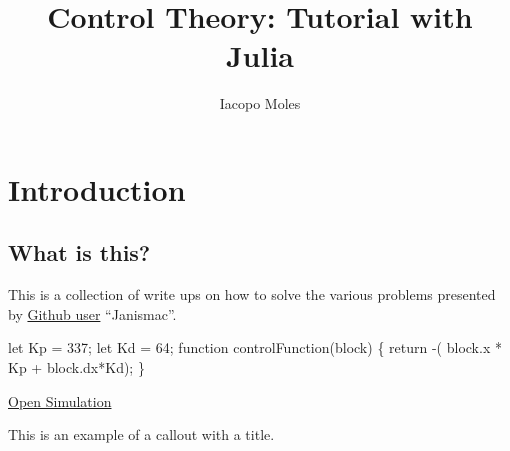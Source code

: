 \documentclass[
  8pt,
  a4paper,
]{book}
\title{Control Theory: Tutorial with Julia}
\author{Iacopo Moles}
\date{}
\newenvironment{Shaded}{\begin{snugshade}}{\end{snugshade}}
\newcommand{\NormalTok}[1]{\textcolor[rgb]{0.00,0.23,0.31}{#1}}
\renewcommand*\contentsname{Table of contents}
\newcommand\contentsname{Table of contents}
\begin{document}
\frontmatter
\maketitle


\renewcommand*\contentsname{Table of contents}
{
\setcounter{tocdepth}{2}
\tableofcontents
}

\mainmatter
{}

\chapter{Introduction}\label{introduction}

\section{What is this?}\label{what-is-this}

This is a collection of write ups on how to solve the various problems
presented by \href{https://janismac.github.io/ControlChallenges/}{Github
user} ``Janismac''.

\begin{Shaded}
\begin{Highlighting}[]
\NormalTok{let Kp = 337;}
\NormalTok{let Kd = 64;}
\NormalTok{function controlFunction(block)}
\NormalTok{\{}
\NormalTok{  return {-}( block.x * Kp + block.dx*Kd);}
\NormalTok{\}}
\end{Highlighting}
\end{Shaded}

\href{https://pages.icpmol.es/ControlChallenges/index.html?target=TutorialBlockWithFriction&code=bGV0IEtwID0gMzM3OwpsZXQgS2QgPSA2NDsKZnVuY3Rpb24gY29udHJvbEZ1bmN0aW9uKGJsb2NrKQp7CiAgcmV0dXJuIC0oIGJsb2NrLnggKiBLcCArIGJsb2NrLmR4KktkKTsKfQ==}{Open
Simulation}

\begin{tcolorbox}[enhanced jigsaw, leftrule=.75mm, colframe=quarto-callout-tip-color-frame, opacitybacktitle=0.6, rightrule=.15mm, bottomrule=.15mm, toprule=.15mm, breakable, colback=white, opacityback=0, coltitle=black, bottomtitle=1mm, toptitle=1mm, titlerule=0mm, title=\textcolor{quarto-callout-tip-color}{\faLightbulb}\hspace{0.5em}{Tip with Title}, arc=.35mm, left=2mm, colbacktitle=quarto-callout-tip-color!10!white]

This is an example of a callout with a title.

\end{tcolorbox}
\end{document}
